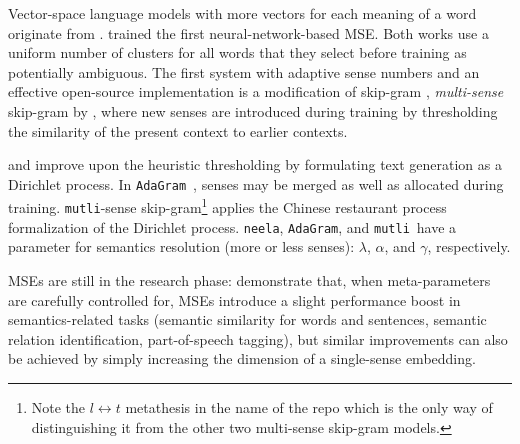 \documentclass[11pt]{article}
\newcommand{\neelakantan}{\texttt{neela}}
\newcommand{\adagram}{\texttt{AdaGram}}
\newcommand{\mutli}{\texttt{mutli}}
\begin{document}
\label{sec:mse}

Vector-space language models with more vectors for each meaning of a
word originate from \cite{Reisinger:2010}.
\cite{Huang:2012} trained the first neural-network-based MSE.
Both works use a uniform number of clusters for all words that they select
before training as potentially ambiguous.
The first system with adaptive sense numbers and an effective open-source
implementation is a modification of skip-gram \cite{Mikolov:2013d},
\emph{multi-sense} skip-gram by \cite{Neelakantan:2014}, where new senses are
introduced during training by thresholding the similarity of the present
context to earlier contexts.



\cite{Bartunov:2015} and \cite{Li:2015} improve upon the heuristic thresholding
by formulating text generation as a Dirichlet process. In
\adagram~\citep{Bartunov:2015}, senses may be merged as well as allocated
during training. \mutli-sense skip-gram\footnote{Note the $l\leftrightarrow
t$ metathesis in the name of the repo which is the only way of distinguishing it
from the other two multi-sense skip-gram models.} \citep{Li:2015} applies the
Chinese restaurant process formalization of the Dirichlet process. 
\neelakantan, \adagram, and \mutli~have a parameter for semantics resolution (more or less
senses): $\lambda$, $\alpha$, and $\gamma$, respectively.


MSEs are still in the research phase: \cite{Li:2015}  demonstrate that, when
meta-parameters are carefully controlled for, MSEs introduce a slight
performance boost in semantics-related tasks (semantic similarity for words and
sentences, semantic relation identification, part-of-speech tagging), but
similar improvements can also be achieved by simply increasing the dimension of
a single-sense embedding.
\end{document}
